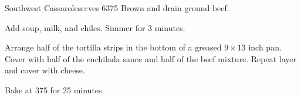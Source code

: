 
\begin{recipe}{Southwest Cassarole}{serves 6}{375\0}
    Brown and drain ground beef.

    Add soup, milk, and chiles. Simmer for 3 minutes.

    Arrange half of the tortilla strips in the bottom of a greased $9 \times 13$ inch pan. Cover with half of the enchilada sauce and half of the beef mixture. Repeat layer and cover with cheese.

    \ingredient{}{}
    Bake at 375\0 for 25 minutes.

\end{recipe}
